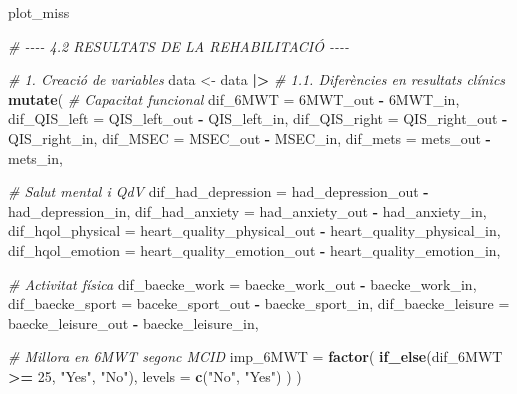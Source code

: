 \documentclass[CAT]{TFUOC}%
\newenvironment{Shaded}{\begin{snugshade}}{\end{snugshade}}
\newcommand{\AttributeTok}[1]{\textcolor[rgb]{0.13,0.29,0.53}{#1}}
\newcommand{\CommentTok}[1]{\textcolor[rgb]{0.56,0.35,0.01}{\textit{#1}}}
\newcommand{\DecValTok}[1]{\textcolor[rgb]{0.00,0.00,0.81}{#1}}
\newcommand{\FunctionTok}[1]{\textcolor[rgb]{0.13,0.29,0.53}{\textbf{#1}}}
\newcommand{\NormalTok}[1]{#1}
\newcommand{\OtherTok}[1]{\textcolor[rgb]{0.56,0.35,0.01}{#1}}
\newcommand{\SpecialCharTok}[1]{\textcolor[rgb]{0.81,0.36,0.00}{\textbf{#1}}}
\newcommand{\StringTok}[1]{\textcolor[rgb]{0.31,0.60,0.02}{#1}}
\begin{document}
\begin{Shaded}
\begin{Highlighting}[]
\NormalTok{plot\_miss}

\CommentTok{\# {-}{-}{-}{-} 4.2 RESULTATS DE LA REHABILITACIÓ {-}{-}{-}{-}}

\CommentTok{\# 1. Creació de variables}
\NormalTok{data }\OtherTok{\textless{}{-}}\NormalTok{ data }\SpecialCharTok{|\textgreater{}} 
  \CommentTok{\# 1.1. Diferències en resultats clínics}
  \FunctionTok{mutate}\NormalTok{(}
    \CommentTok{\# Capacitat funcional}
    \AttributeTok{dif\_6MWT =} \StringTok{\textasciigrave{}}\AttributeTok{6MWT\_out}\StringTok{\textasciigrave{}} \SpecialCharTok{{-}} \StringTok{\textasciigrave{}}\AttributeTok{6MWT\_in}\StringTok{\textasciigrave{}}\NormalTok{,}
    \AttributeTok{dif\_QIS\_left =}\NormalTok{ QIS\_left\_out }\SpecialCharTok{{-}}\NormalTok{ QIS\_left\_in,}
    \AttributeTok{dif\_QIS\_right =}\NormalTok{ QIS\_right\_out }\SpecialCharTok{{-}}\NormalTok{ QIS\_right\_in,}
    \AttributeTok{dif\_MSEC =}\NormalTok{ MSEC\_out }\SpecialCharTok{{-}}\NormalTok{ MSEC\_in,}
    \AttributeTok{dif\_mets =}\NormalTok{ mets\_out }\SpecialCharTok{{-}}\NormalTok{ mets\_in,}
    
    \CommentTok{\# Salut mental i QdV}
    \AttributeTok{dif\_had\_depression =}\NormalTok{ had\_depression\_out }\SpecialCharTok{{-}}\NormalTok{ had\_depression\_in,}
    \AttributeTok{dif\_had\_anxiety =}\NormalTok{ had\_anxiety\_out }\SpecialCharTok{{-}}\NormalTok{ had\_anxiety\_in,}
    \AttributeTok{dif\_hqol\_physical =}\NormalTok{ heart\_quality\_physical\_out }\SpecialCharTok{{-}}\NormalTok{ heart\_quality\_physical\_in,}
    \AttributeTok{dif\_hqol\_emotion =}\NormalTok{ heart\_quality\_emotion\_out }\SpecialCharTok{{-}}\NormalTok{ heart\_quality\_emotion\_in,}
    
    \CommentTok{\# Activitat física}
    \AttributeTok{dif\_baecke\_work =}\NormalTok{ baecke\_work\_out }\SpecialCharTok{{-}}\NormalTok{ baecke\_work\_in,}
    \AttributeTok{dif\_baecke\_sport =}\NormalTok{ baceke\_sport\_out }\SpecialCharTok{{-}}\NormalTok{ baecke\_sport\_in,}
    \AttributeTok{dif\_baecke\_leisure =}\NormalTok{ baecke\_leisure\_out }\SpecialCharTok{{-}}\NormalTok{ baecke\_leisure\_in, }
    
    \CommentTok{\# Millora en 6MWT segonc MCID}
    \AttributeTok{imp\_6MWT =} \FunctionTok{factor}\NormalTok{(}
      \FunctionTok{if\_else}\NormalTok{(dif\_6MWT }\SpecialCharTok{\textgreater{}=} \DecValTok{25}\NormalTok{, }\StringTok{"Yes"}\NormalTok{, }\StringTok{"No"}\NormalTok{), }
      \AttributeTok{levels =} \FunctionTok{c}\NormalTok{(}\StringTok{"No"}\NormalTok{, }\StringTok{"Yes"}\NormalTok{)}
\NormalTok{    )}
\NormalTok{  )}
  

\end{Highlighting}
\end{Shaded}
\end{document}
